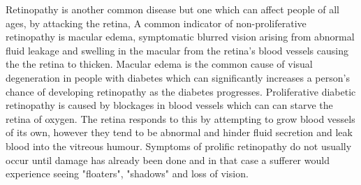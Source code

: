 Retinopathy is another common disease but one which can affect people of
all ages, by attacking the retina, A common indicator of non-proliferative
retinopathy is macular edema, symptomatic blurred vision arising from
abnormal fluid leakage and swelling in the macular from the retina's
blood vessels causing the the retina to thicken.\cite{hee1995quantitative}
Macular edema is the common cause of visual degeneration in people with
diabetes which can significantly increases a person's chance of developing
retinopathy as the diabetes progresses.\cite{klein1984wisconsin} Proliferative
diabetic retinopathy is caused by blockages in blood vessels which can can
starve the retina of oxygen. The retina responds to this by attempting to
grow blood vessels of its own, however they tend to be abnormal and hinder
fluid secretion and leak blood into the vitreous humour. Symptoms of
prolific retinopathy do not usually occur until damage has already been
done and in that case a sufferer would experience seeing "floaters",
"shadows" and loss of vision.
